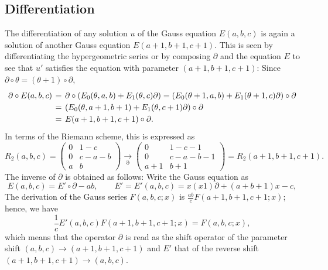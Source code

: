 \documentclass[a4paper,12pt]{article}
\theoremstyle{definition}
\theoremstyle{remark}
\numberwithin{equation}{section} %
\begin{document}
\subsection{Differentiation}\label{E2Der}
The differentiation of any solution $u$ of the Gauss equation 
$E(a,b,c)$ is again a solution of another Gauss equation $E(a+1,b+1,c+1)$.
This is seen by differentiating the hypergeometric series or
by composing $\partial$ and the equation $E$ to see that $u'$ satisfies
the equation with parameter $(a+1,b+1,c+1)$:
Since $\partial\circ \theta=(\theta+1)\circ \partial$,
\[\def\arraystretch{1.2}\setlength\arraycolsep{2pt} \begin{array}{rcl}
\partial\circ E(a,b,c)&=&\partial\circ(E_0(\theta,a,b)+E_1(\theta,c)\partial)
  =(E_0(\theta+1,a,b)+E_1(\theta+1,c)\partial)\circ \partial\\
  &=& (E_0(\theta,a+1,b+1)+E_1(\theta,c+1)\partial)\circ \partial\\
  &=& E(a+1,b+1,c+1)\circ \partial.\end{array}
\]  
In terms of the Riemann scheme, this is expressed as
 \addtolength{\arraycolsep}{-1pt}  %
\[R_2(a,b,c)=\left( \begin{array}{cc}
0&1-c\\
0&c-a-b\\
a&b\end{array}\right)
\underset{\partial}{\to}
\left(\begin{array}{cc}
0&1-c-1\\
0&c-a-b-1\\
a+1&b+1\end{array}\right)=R_2(a+1,b+1,c+1).\]
 \addtolength{\arraycolsep}{1pt}  %
The inverse of $\partial$ is obtained as follows:
Write the Gauss equation as 
$$E(a,b,c)=E'\circ \partial-ab,\qquad E'=E'(a,b,c)=x(x1)\partial+(a+b+1)x-c,$$
The derivation of the Gauss series $F(a,b,c;x)$
is $\frac{ab}cF(a+1,b+1,c+1;x)$; hence, we have
$$\frac1cE'(a,b,c)F(a+1,b+1,c+1;x)=F(a,b,c;x),
$$
which means that the operator $\partial$ is read as the shift operator of the parameter shift $(a,b,c)\to(a+1,b+1,c+1)$ and
$E'$ that of the reverse  shift $(a+1,b+1,c+1)\to(a,b,c)$.
\end{document}
